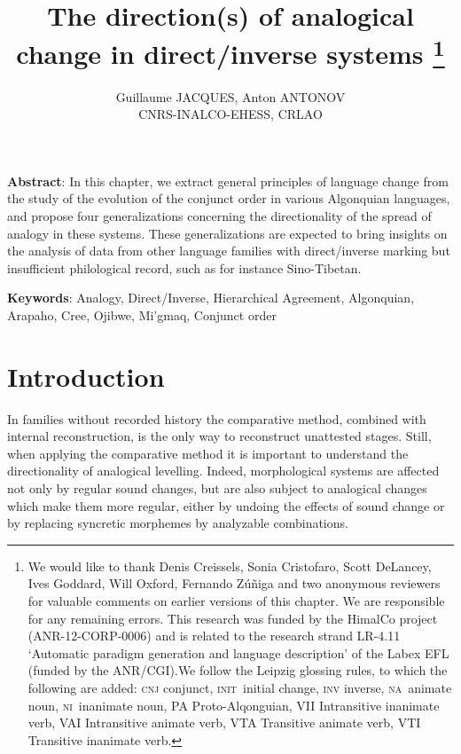 \documentclass[twoside,a4paper,11pt]{article}
\newcommand{\init}{\textsc{init}}
\newcommand{\nanim}{\textsc{na}}
\newcommand{\ninan}{\textsc{ni}}
\begin{document}
\title{The direction(s) of analogical change in direct/inverse systems \footnote{We would like to thank Denis Creissels, Sonia Cristofaro, Scott DeLancey, Ives Goddard, Will Oxford, Fernando Zúñiga and two anonymous reviewers for valuable comments on earlier versions of this chapter. We are responsible for any remaining errors. This research was funded by the HimalCo project (ANR-12-CORP-0006) and is related to the research strand LR-4.11 `Automatic paradigm generation and language description' of the Labex EFL (funded by the ANR/CGI).We follow the Leipzig glossing rules, to which the following are added: \textsc{cnj} conjunct, \init\ initial change, \textsc{inv} inverse, \nanim\ animate noun, \ninan\ inanimate noun, PA Proto-Alqonguian, VII Intransitive inanimate verb, VAI Intransitive animate verb, VTA Transitive animate verb, VTI Transitive inanimate verb.  } }

\author{Guillaume JACQUES, Anton ANTONOV\\ CNRS-INALCO-EHESS, CRLAO}
\maketitle

\textbf{Abstract}: In this chapter, we extract general principles of language change from the study of the evolution of the conjunct order in various Algonquian languages, and propose four generalizations concerning the directionality of the spread of analogy in these systems. These generalizations are expected to bring insights on the analysis of data from other language families with direct/inverse marking but insufficient philological record, such as for instance Sino-Tibetan.

\textbf{Keywords}: Analogy, Direct/Inverse, Hierarchical Agreement, Algonquian, Arapaho, Cree, Ojibwe, Mi'gmaq, Conjunct order

 
\section{Introduction}
In families without recorded history the comparative method, combined with internal reconstruction, is the only way to reconstruct unattested stages. Still, when applying the comparative method it is important to understand the directionality of analogical levelling.  Indeed, morphological systems are affected not only by regular sound changes, but are also subject to analogical changes which make them more regular, either by undoing the effects of sound change or by replacing syncretic morphemes by analyzable combinations.
\end{document}
